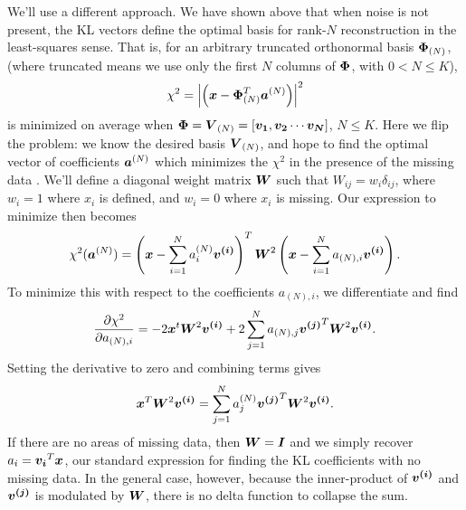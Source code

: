 We'll use a different approach.  We have shown above that when noise is
not present, the KL vectors define the optimal basis for rank-$N$
reconstruction in the least-squares sense.  That is, for an arbitrary
truncated orthonormal basis $\boldsymbol{\Phi}_{(N)}$, (where truncated means
we use only the first $N$ columns of $\boldsymbol{\Phi}$, with $0 < N \le K$),
\begin{equation}
  \chi^2 = \left|\left(\boldsymbol{x}
  - \boldsymbol{\Phi}_{(N)}^T\boldsymbol{a}^{(N)}\right)\right|^2
\end{equation}
is minimized on average when
$\boldsymbol{\Phi} = \boldsymbol{V}_{(N)}
= [\boldsymbol{v_1}, \boldsymbol{v_2} \cdots \boldsymbol{v_N}]$, $N \le K$.
Here we flip the problem: we know the desired basis $\boldsymbol{V}_{(N)}$,
and hope to find the optimal vector of coefficients $\boldsymbol{a}^{(N)}$
which minimizes the $\chi^2$ in the presence of the missing data
\citep{Connolly99}.
We'll define a 
diagonal weight matrix $\boldsymbol{W}$ such that $W_{ij} = w_i\delta_{ij}$,
where $w_i=1$ where $x_i$ is defined, and $w_i=0$ where $x_i$ is
missing.  Our expression to minimize then becomes
\begin{equation}
  \chi^2(\boldsymbol{a}^{(N)}) = \left(\boldsymbol{x}
  - \sum_{i=1}^N a^{(N)}_i \boldsymbol{v^{(i)}}\right)^T
  \boldsymbol{W}^2 \left(\boldsymbol{x}
  - \sum_{i=1}^N a_{(N),i} \boldsymbol{v^{(i)}}\right).
\end{equation}
To minimize this with respect to the coefficients $a_{(N),i}$, we differentiate
and find
\begin{equation}
  \frac{\partial\chi^2}{\partial a_{(N),i}} = -2 \boldsymbol{x}^t\boldsymbol{W}^2\boldsymbol{v^{(i)}}
  + 2\sum_{j=1}^N a_{(N),j} \boldsymbol{v^{(j)}}^T \boldsymbol{W}^2 \boldsymbol{v^{(i)}}.
\end{equation}
Setting the derivative to zero and combining terms gives
\begin{equation}
  \label{eq:masked_coeff}
  \boldsymbol{x}^T\boldsymbol{W}^2\boldsymbol{v^{(i)}} =
  \sum_{j=1}^N a^{(N)}_j \boldsymbol{v^{(j)}}^T \boldsymbol{W}^2 \boldsymbol{v^{(i)}}.
\end{equation}
If there are no areas of missing data, then $\boldsymbol{W} = \boldsymbol{I}$ and we
simply recover $a_i = \boldsymbol{v_i}^T\boldsymbol{x}$, our standard expression
for finding the KL coefficients with no missing data.
In the general case, however, because the inner-product of
$\boldsymbol{v^{(i)}}$ and $\boldsymbol{v^{(j)}}$ is modulated by $\boldsymbol{W}$,
there is no delta function to collapse the sum.

